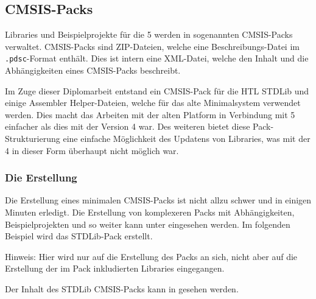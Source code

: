 \subsection[CMSIS-Packs]{\gls{CMSIS}-Packs}
\label{sec:cmsis-packs}

Libraries und Beispielprojekte für die \uVision{} 5 werden in sogenannten \gls{CMSIS}-Packs verwaltet. \gls{CMSIS}-Packs sind \gls{ZIP}-Dateien, welche eine Beschreibungs-Datei im \texttt{.pdsc}-Format enthält. Dies ist intern eine \gls{XML}-Datei, welche den Inhalt und die Abhängigkeiten eines \gls{CMSIS}-Packs beschreibt.

Im Zuge dieser Diplomarbeit entstand ein \gls{CMSIS}-Pack für die HTL \gls{STDLib} und einige Assembler Helper-Dateien, welche für das alte \gls{Minimalsystem} verwendet werden. Dies macht das Arbeiten mit der alten Platform in Verbindung mit \uVision{} 5 einfacher als dies mit der Version 4 war. Des weiteren bietet diese Pack-Strukturierung eine einfache Möglichkeit des Updatens von Libraries, was mit der \uVision{} 4 in dieser Form überhaupt nicht möglich war.

\subsubsection{Die Erstellung}
\label{sec:cmsis-erstellung}

Die Erstellung eines minimalen \gls{CMSIS}-Packs ist nicht allzu schwer und in einigen Minuten erledigt. Die Erstellung von komplexeren Packs mit Abhängigkeiten, Beispielprojekten und so weiter kann unter \cite{arm:CMSISPack} eingesehen werden. Im folgenden Beispiel wird das \gls{STDLib}-Pack erstellt.

\begin{warning}
    Hinweis: Hier wird nur auf die Erstellung des Packs an sich, nicht aber auf die Erstellung der im Pack inkludierten Libraries eingegangen.
\end{warning}

\label{sec:cmsis-inhalt}

Der Inhalt des \gls{STDLib} \gls{CMSIS}-Packs kann in  gesehen werden.


